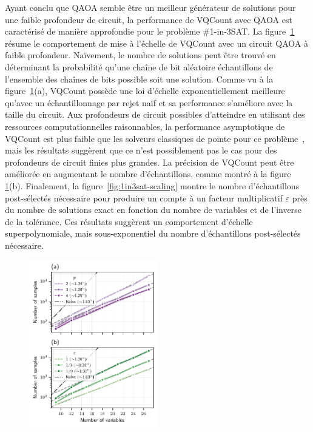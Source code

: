 Ayant conclu que QAOA semble être un meilleur générateur de solutions pour une faible profondeur de circuit, la performance de VQCount avec QAOA est caractérisé de manière approfondie pour le problème \#1-in-3SAT. La figure~\ref{fig:1in3sat-number-of-samples} résume le comportement de mise à l'échelle de VQCount avec un circuit QAOA à faible profondeur. Naïvement, le nombre de solutions peut être trouvé en déterminant la probabilité qu'une chaîne de bit aléatoire échantillons de l'ensemble des chaînes de bits possible soit une solution. Comme vu à la figure~\ref{fig:1in3sat-number-of-samples}(a), VQCount possède une loi d'échelle exponentiellement meilleure qu'avec un échantillonnage par rejet naïf et sa performance s'améliore avec la taille du circuit. Aux profondeurs de circuit possibles d'atteindre en utilisant des ressources computationnelles raisonnables, la performance asymptotique de VQCount est plus faible que les solveurs classiques de pointe pour ce problème~\cite{kourtisFastCountingTensor2019}, mais les résultats suggèrent que ce n'est possiblement pas le cas pour des profondeurs de circuit finies plus grandes. La précision de VQCount peut être améliorée en augmentant le nombre d'échantillons, comme montré à la figure \ref{fig:1in3sat-number-of-samples}(b). Finalement, la figure~\ref{fig:1in3sat-scaling} montre le nombre d'échantillons post-sélectés nécessaire pour produire un compte à un facteur multiplicatif $\varepsilon$ près du nombre de solutions exact en fonction du nombre de variables et de l'inverse de la tolérance. Ces résultats suggèrent un comportement d'échelle superpolynomiale, mais sous-exponentiel du nombre d'échantillons post-sélectés nécessaire. 

\begin{figure}[h!]
    \centering
    \includegraphics[width=0.5\textwidth]{figures/1in3sat-number-of-samples.pdf}
    \caption{}
    \label{fig:1in3sat-number-of-samples}
\end{figure}

